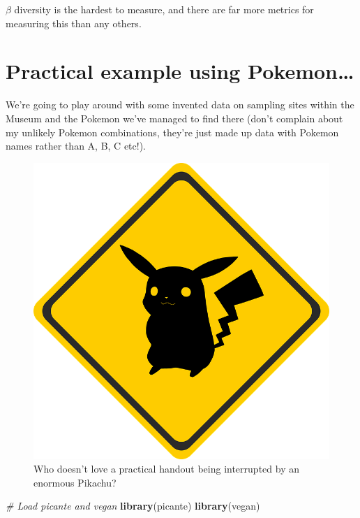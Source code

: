\documentclass[]{book}
\newenvironment{Shaded}{\begin{snugshade}}{\end{snugshade}}
\newcommand{\KeywordTok}[1]{\textcolor[rgb]{0.13,0.29,0.53}{\textbf{{#1}}}}
\newcommand{\CommentTok}[1]{\textcolor[rgb]{0.56,0.35,0.01}{\textit{{#1}}}}
\newcommand{\NormalTok}[1]{{#1}}
\begin{document}
\(\beta\) diversity is the hardest to measure, and there are far more
metrics for measuring this than any others.

\section{Practical example using
Pokemon\ldots{}}\label{practical-example-using-pokemon}

We're going to play around with some invented data on sampling sites
within the Museum and the Pokemon we've managed to find there (don't
complain about my unlikely Pokemon combinations, they're just made up
data with Pokemon names rather than A, B, C etc!).

\begin{figure}
\centering
\includegraphics{pokemon.png}
\caption{Who doesn't love a practical handout being interrupted by an
enormous Pikachu?}
\end{figure}

\begin{Shaded}
\begin{Highlighting}[]
\CommentTok{# Load picante and vegan}
\KeywordTok{library}\NormalTok{(picante)}
\KeywordTok{library}\NormalTok{(vegan)}
\end{Highlighting}
\end{Shaded}
\end{document}
